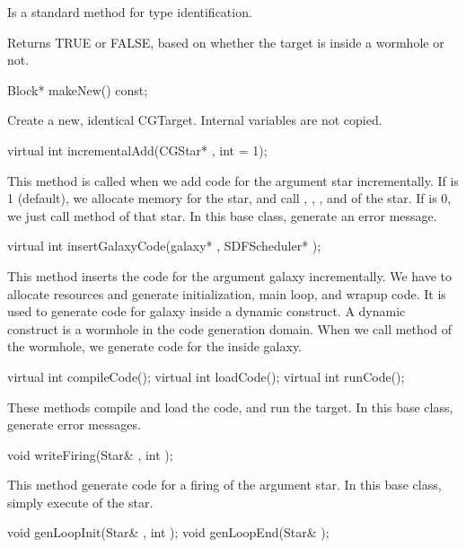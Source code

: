 Is a standard  method for type identification.

Returns TRUE or FALSE, based on whether the target is inside a wormhole or not.

\begin{example}
Block* makeNew() const;
\end{example}

Create a new, identical CGTarget. Internal variables are not copied.

\begin{example}
virtual int incrementalAdd(CGStar* , int  = 1);
\end{example}

This method is called when we add code for the argument star 
incrementally. If  is 1 (default), we allocate memory for the star, 
and call , , , and  of
the star. If  is 0, we just call  method of that star.
In this base class, generate an error
message.

\begin{example}
virtual int insertGalaxyCode(galaxy* , SDFScheduler* );
\end{example}

This method inserts the code for the argument galaxy  incrementally.
We have to allocate resources and generate initialization, main loop, and
wrapup code. It is used to generate code for galaxy inside a dynamic
construct. A dynamic construct is a wormhole in the code generation domain.
When we call  method of the wormhole, we generate code
for the inside galaxy. 

\begin{example}
virtual int compileCode();
virtual int loadCode();
virtual int runCode();
\end{example}

These methods compile and load the code, and run the target. In this base
class, generate error messages.

\begin{example}
void writeFiring(Star& , int );
\end{example}

This method generate code for a firing of the argument star. In this base
class, simply execute  of the star.

\begin{example}
void genLoopInit(Star& , int );
void genLoopEnd(Star& );
\end{example}

